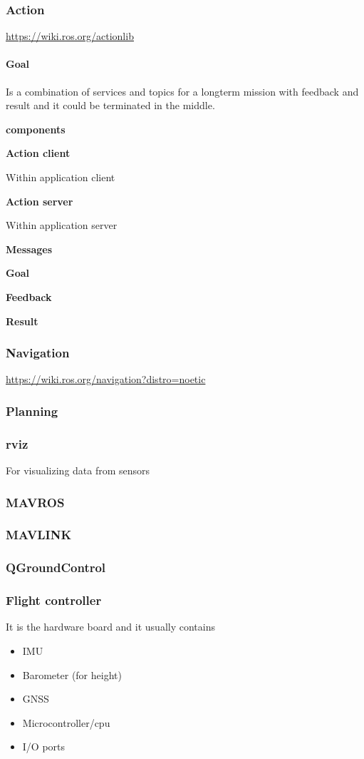 \documentclass{book}
\providecommand{\ProjectDeepHeading}[2]{%
    \par\medskip\noindent\textbf{#2}\par\smallskip
}
\providecommand{\ProjectSafeIncludePdf}[2][]{}
\begin{document}
\subsubsection{Action}
    \url{https://wiki.ros.org/actionlib}
    \ProjectSafeIncludePdf[pages=-]{../assets/ros/action.pdf}
    \paragraph{Goal}

Is a combination of services and topics for a longterm mission with feedback and result and it could be terminated in the middle.
    \ProjectDeepHeading{1}{components}
        \ProjectDeepHeading{2}{Action client}
            Within application client
        \ProjectDeepHeading{2}{Action server}
            Within application server
    
    \ProjectDeepHeading{1}{Messages}
        \ProjectDeepHeading{2}{Goal}
        \ProjectDeepHeading{2}{Feedback}
        \ProjectDeepHeading{2}{Result}

\subsubsection{Navigation}
    \url{https://wiki.ros.org/navigation?distro=noetic}

\subsubsection{Planning}
\subsubsection{rviz}
    For visualizing data from sensors
\subsubsection{MAVROS}
\subsubsection{MAVLINK}
\subsubsection{QGroundControl}
\subsubsection{Flight controller}
    It is the hardware board and it usually contains
    \begin{itemize}
        \item IMU
        \item Barometer (for height)
        \item GNSS
        \item Microcontroller/cpu
        \item I/O ports
    \end{itemize}
\end{document}
